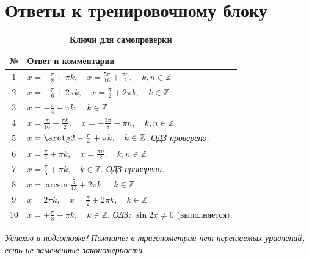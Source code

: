 \documentclass[a4paper,12pt]{article}
\begin{document}
\section*{Ответы к тренировочному блоку}

\begin{table}[h]
    \centering
    \renewcommand{\arraystretch}{1.6}
    \caption*{\large\bfseries\color{darkaccent} Ключи для самопроверки}
    \vspace{0.2cm}
    \begin{tabularx}{\linewidth}{c >{\raggedright\arraybackslash}X}
        \toprule
        \textbf{№} & \textbf{Ответ и комментарии} \\
        \midrule
        1 & $x = -\frac{\pi}{8} + \pi k, \quad x = \frac{5\pi}{16} + \frac{\pi n}{2}, \quad k, n \in \mathbb{Z}$ \\
        \midrule
        2 & $x = -\frac{\pi}{6} + 2\pi k, \quad x = \frac{\pi}{2} + 2\pi k, \quad k \in \mathbb{Z}$ \\
        \midrule
        3 & $x = -\frac{\pi}{4} + \pi k, \quad k \in \mathbb{Z}$ \\
        \midrule
        4 & $x = \frac{\pi}{16} + \frac{\pi k}{2}, \quad x = -\frac{3\pi}{8} + \pi n, \quad k, n \in \mathbb{Z}$ \\
        \midrule
        5 & $x = \arctg 2 - \frac{\pi}{4} + \pi k, \quad k \in \mathbb{Z}$. \textit{ОДЗ проверено.} \\
        \midrule
        6 & $x = \frac{\pi}{4} + \pi k, \quad x = \frac{\pi n}{2}, \quad k, n \in \mathbb{Z}$ \\
        \midrule
        7 & $x = \frac{\pi}{6} + \pi k, \quad k \in \mathbb{Z}$. \textit{ОДЗ проверено.} \\
        \midrule
        8 & $x = \arcsin\frac{5}{13} + 2\pi k, \quad k \in \mathbb{Z}$ \\
        \midrule
        9 & $x = 2\pi k, \quad x = \frac{\pi}{2} + 2\pi k, \quad k \in \mathbb{Z}$ \\
        \midrule
        10 & $x = \pm\frac{\pi}{8} + \pi k, \quad k \in \mathbb{Z}$. \textit{ОДЗ: } $\sin 2x \neq 0 \text{ (выполняется).}$ \\
        \bottomrule
    \end{tabularx}
\end{table}

\vfill
\begin{center}
    \small\color{textgray}
    \textit{Успехов в подготовке! Помните: в тригонометрии нет нерешаемых уравнений, есть не замеченные закономерности.}
\end{center}
\end{document}
